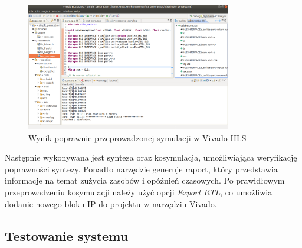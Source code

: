 \begin{figure}
  \centering
  \includegraphics[width=0.8\textwidth]{img/vivado_hls_sim.png}
  \caption{Wynik poprawnie przeprowadzonej symulacji w Vivado HLS}
  \label{hls_design_sim}
\end{figure}


Następnie wykonywana jest synteza oraz kosymulacja, umożliwiająca 
weryfikację poprawności syntezy. Ponadto narzędzie generuje raport, który przedstawia
informacje na temat zużycia zasobów i opóźnień czasowych. Po prawidłowym 
przeprowadzeniu kosymulacji należy użyć opcji \emph{Export RTL}, co umożliwia 
dodanie nowego bloku IP do projektu w narzędziu Vivado. 



\subsection{Testowanie systemu}



